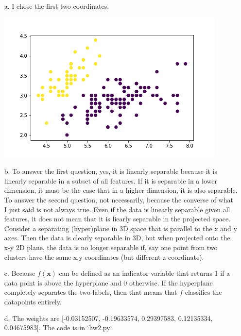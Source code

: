 \documentclass[11pt]{article}
\newcommand{\bx}{\mathbf{x}}
\begin{document}
\color{blue}
\begin{itemize}
\item[a.] I chose the first two coordinates.

\includegraphics[scale=0.8]{iris}
\item[b.] To answer the first question, yes, it is linearly separable because it is linearly separable in a subset of all features. If it is separable in a lower dimension, it must be the case that in a higher dimension, it is also separable. To answer the second question, not necessarily, because the converse of what I just said is not always true. Even if the data is linearly separable given all features, it does not mean that it is liearly separable in the projected space. Consider a separating (hyper)plane in 3D space that is parallel to the x and y axes. Then the data is clearly separable in 3D, but when projected onto the x-y 2D plane, the data is no longer separable if, say one point from two clusters have the same x,y coordinates (but different z coordinate).
\item[c.] Because $f(\bx)$ can be defined as an indicator variable that returns 1 if a data point is above the hyperplane and 0 otherwise. If the hyperplane completely separates the two labels, then that means that $f$ classifies the datapoints entirely.
\item[d.] The weights are [-0.03152507, -0.19633574,  0.29397583,  0.12135334,  0.04675983]. The code is in `hw2.py`.
\end{itemize}
\color{black}
\end{document}
